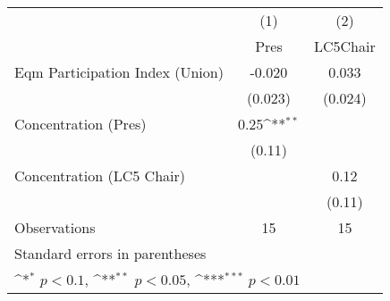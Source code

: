 {
\def\sym#1{\ifmmode^{#1}\else\(^{#1}\)\fi}
\begin{tabular}{l*{2}{c}}
\toprule
                &\multicolumn{1}{c}{(1)}&\multicolumn{1}{c}{(2)}\\
                &\multicolumn{1}{c}{Pres}&\multicolumn{1}{c}{LC5Chair}\\
\midrule
Eqm Participation Index (Union)&   -0.020         &    0.033         \\
                &  (0.023)         &  (0.024)         \\
Concentration (Pres)&     0.25\sym{**} &                  \\
                &   (0.11)         &                  \\
Concentration (LC5 Chair)&                  &     0.12         \\
                &                  &   (0.11)         \\
\midrule
Observations    &       15         &       15         \\
\bottomrule
\multicolumn{3}{l}{\footnotesize Standard errors in parentheses}\\
\multicolumn{3}{l}{\footnotesize \sym{*} \(p<0.1\), \sym{**} \(p<0.05\), \sym{***} \(p<0.01\)}\\
\end{tabular}
}
